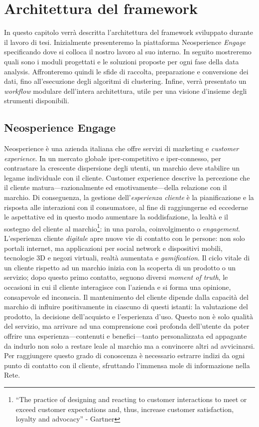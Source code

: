 \chapter{Architettura del framework}
\label{capitolo3}
\thispagestyle{empty}
In questo capitolo verr\`a descritta l'architettura del framework sviluppato durante il lavoro di tesi. Inizialmente presenteremo la piattaforma Neosperience \textit{Engage} specificando dove si colloca il nostro lavoro al suo interno. In seguito mostreremo quali sono i moduli progettati e le soluzioni proposte per ogni fase della data analysis. Affronteremo quindi le sfide di raccolta, preparazione e conversione dei dati, fino all'esecuzione degli algoritmi di clustering. Infine, verr\`a presentato un \textit{workflow} modulare dell'intera architettura, utile per una visione d'insieme degli strumenti disponibili.
\section{Neosperience Engage}
Neosperience \`e una azienda italiana che offre servizi di marketing e \textit{customer experience}. In un mercato globale \mbox{iper-competitivo} e \mbox{iper-connesso}, per contrastare la crescente dispersione degli utenti, un marchio deve stabilire un legame individuale con il cliente. Customer experience descrive la percezione che il cliente matura---razionalmente ed emotivamente---della relazione con il marchio. Di conseguenza, la gestione dell'\textit{esperienza cliente} \`e la pianificazione e la risposta alle interazioni con il consumatore, al fine di raggiungerne ed eccederne le aspettative ed in questo modo aumentare la soddisfazione, la lealt\`a e il sostegno del cliente al marchio\footnote{``The practice of designing and reacting to customer interactions to meet or exceed customer expectations and, thus, increase customer satisfaction, loyalty and advocacy'' - Gartner}: in una parola, coinvolgimento o \textit{engagement}. L'esperienza cliente \textit{digitale} apre nuove vie di contatto con le persone: non solo portali internet, ma applicazioni per social network e dispositivi mobili, tecnologie 3D e negozi virtuali, realt\`a aumentata e \textit{gamification}. Il ciclo vitale di un cliente rispetto ad un marchio inizia con la scoperta di un prodotto o un servizio; dopo questo primo contatto, seguono diversi \textit{moment of truth}, le occasioni in cui il cliente interagisce con l'azienda e si forma una opinione, consapevole ed inconscia. Il mantenimento del cliente dipende dalla capacit\`a del marchio di influire positivamente in ciascuno di questi istanti: la valutazione del prodotto, la decisione dell'acquisto e l'esperienza d'uso. Questo non \`e solo qualit\`a del servizio, ma arrivare ad una comprensione cos\`i profonda dell'utente da poter offrire una esperienza---contenuti e benefici---tanto personalizzata ed appagante da indurlo non solo a restare leale al marchio ma a convincere altri ad avvicinarsi. Per raggiungere questo grado di conoscenza \`e necessario estrarre indizi da ogni punto di contatto con il cliente, sfruttando l'immensa mole di informazione nella Rete.\\
